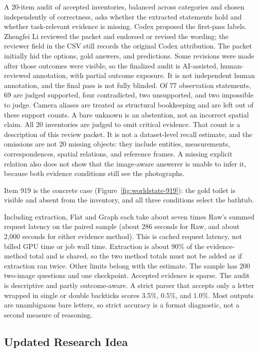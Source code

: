 A 20-item audit of accepted inventories, balanced across categories and chosen independently of correctness, asks whether the extracted statements hold and whether task-relevant evidence is missing. Codex proposed the first-pass labels. Zhengfei Li reviewed the packet and endorsed or revised the wording; the reviewer field in the CSV still records the original Codex attribution. The packet initially hid the options, gold answers, and predictions. Some revisions were made after those outcomes were visible, so the finalized audit is AI-assisted, human-reviewed annotation, with partial outcome exposure. It is not independent human annotation, and the final pass is not fully blinded. Of 77 observation statements, 69 are judged supported, four contradicted, two unsupported, and two impossible to judge. Camera aliases are treated as structural bookkeeping and are left out of these support counts. A bare unknown is an abstention, not an incorrect spatial claim. All 20 inventories are judged to omit critical evidence. That count is a description of this review packet. It is not a dataset-level recall estimate, and the omissions are not 20 missing objects: they include entities, measurements, correspondences, spatial relations, and reference frames. A missing explicit relation also does not show that the image-aware answerer is unable to infer it, because both evidence conditions still see the photographs.

Item 919 is the concrete case (Figure~\ref{fig:worldstate-919}): the gold toilet is visible and absent from the inventory, and all three conditions select the bathtub.

Including extraction, Flat and Graph each take about seven times Raw's summed request latency on the paired sample (about 286 seconds for Raw, and about 2{,}000 seconds for either evidence method). This is cached request latency, not billed GPU time or job wall time. Extraction is about 90\% of the evidence-method total and is shared, so the two method totals must not be added as if extraction ran twice. Other limits belong with the estimate. The sample has 200 two-image questions and one checkpoint. Accepted evidence is sparse. The audit is descriptive and partly outcome-aware. A strict parser that accepts only a letter wrapped in single or double backticks scores 3.5\%, 0.5\%, and 1.0\%. Most outputs are unambiguous bare letters, so strict accuracy is a format diagnostic, not a second measure of reasoning.

\subsection{Updated Research Idea}

